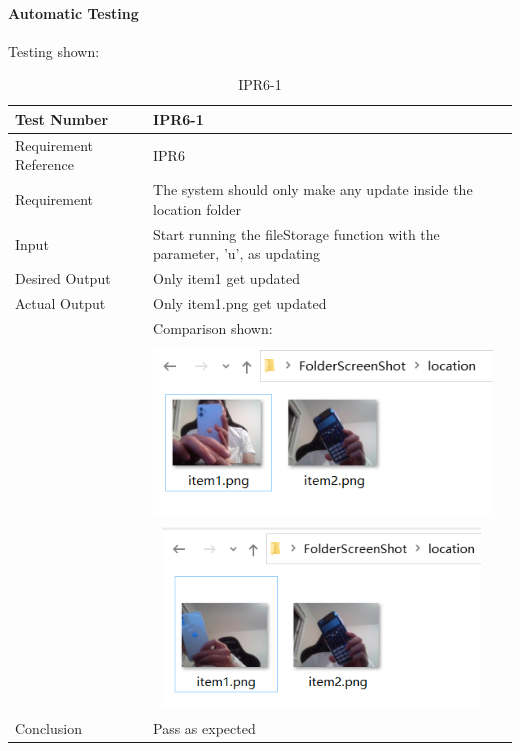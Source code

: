 \documentclass[12pt, titlepage]{article}
\begin{document}
\paragraph{Automatic Testing}{Testing shown:}

\begin{table}[H]
\begin{center}
\begin{tabular}{|l | m{9cm}|}
\hline
  Test Number & IPR6-1\\
  \hline
  Requirement Reference & IPR6\\
  \hline
  Requirement & The system should only make any update inside the location folder\\
  \hline
  Input & Start running the fileStorage function with the parameter, 'u', as updating\\
  \hline
  Desired Output & Only item1 get updated\\
  \hline
  Actual Output & Only item1.png get updated\\&Comparison shown:\\&\includegraphics[width=90mm, height=46mm]{UT41.png}\\&\includegraphics[width=89mm, height=48mm]{UT42.png}\\
  \hline
  Conclusion & Pass as expected\\
  \hline
\end{tabular}
\end{center}       
\caption{IPR6-1}
\end{table}
\end{document}
